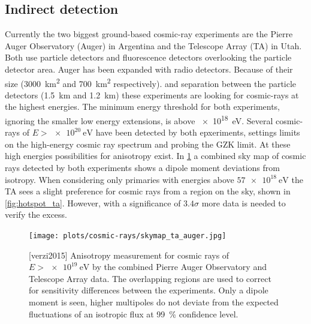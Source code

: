\subsection{Indirect detection}


Currently the two biggest ground-based cosmic-ray experiments are the Pierre Auger Observatory (Auger) in Argentina and the Telescope Array (TA) in Utah. Both use particle detectors and fluorescence detectors overlooking the particle detector area. Auger has been expanded with radio detectors. Because of their size (\SI{3000}{\kilo\meter\squared} and \SI{700}{\kilo\meter\squared} respectively). and separation between the particle detectors (\SI{1.5}{\kilo\meter} and \SI{1.2}{\kilo\meter}) these experiments are looking for cosmic-rays at the highest energies. The minimum energy threshold for both experiments, ignoring the smaller low energy extensions, is above \SI{e18}{\eV}. Several cosmic-rays of $E > \SI{e20}{\eV}$ have been detected by both epxeriments, settings limits on the high-energy cosmic ray spectrum and probing the GZK limit. At these high energies possibilities for anisotropy exist. In \cref{fig:skymap_ta_auger} a combined sky map of cosmic rays detected by both experiments shows a dipole moment deviations from isotropy. When considering only primaries with energies above $\SI{57e18}{\eV}$ the TA sees a slight preference for cosmic rays from a region on the sky, shown in \cref{fig:hotspot_ta}. However, with a significance of $3.4 \sigma$ more data is needed to verify the excess.

\begin{figure}
    \centering
    \texttt{[image: plots/cosmic-rays/skymap\_ta\_auger.jpg]}
    \caption{[verzi2015] Anisotropy measurement for cosmic rays of $E > \SI{e19}{\eV}$ by the combined Pierre Auger Observatory and Telescope Array data. The overlapping regions are used to correct for sensitivity differences between the experiments. Only a dipole moment is seen, higher multipoles do not deviate from the expected fluctuations of an isotropic flux at \SI{99}{\percent} confidence level.}
    \label{fig:skymap_ta_auger}
\end{figure}


